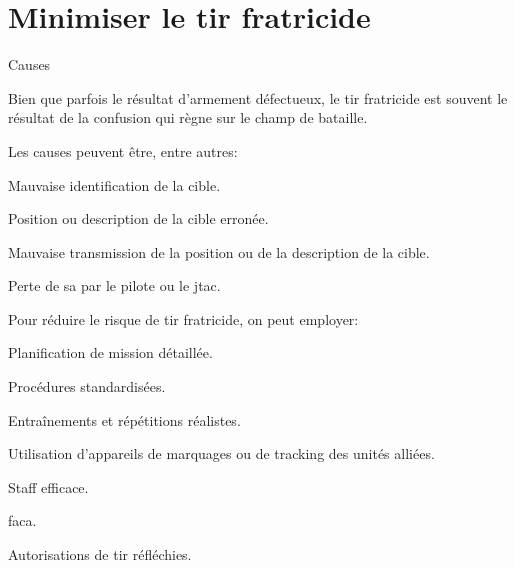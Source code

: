 \section{Minimiser le tir fratricide}

\begin{e1}
	
	\item{Causes}{
		Bien que parfois le résultat d'armement défectueux, le tir fratricide est souvent le résultat de la confusion qui règne sur le champ de bataille.
		
		
		Les causes peuvent être, entre autres:
		\begin{e2}
			\item Mauvaise identification de la cible.
			\item Position ou description de la cible erronée.
			\item Mauvaise transmission de la position ou de la description de la cible.
			\item Perte de \gls{sa} par le pilote ou le \gls{jtac}.
		\end{e2}
		
		Pour réduire le risque de tir fratricide, on peut employer:
		\begin{e2}
			\item Planification de mission détaillée.
			\item Procédures standardisées.
			\item Entraînements et répétitions réalistes.
			\item Utilisation d'appareils de marquages ou de tracking des unités alliées.
			\item Staff efficace.
			\item \gls{faca}.
			\item Autorisations de tir réfléchies.
		\end{e2}
	}
	
\end{e1}
